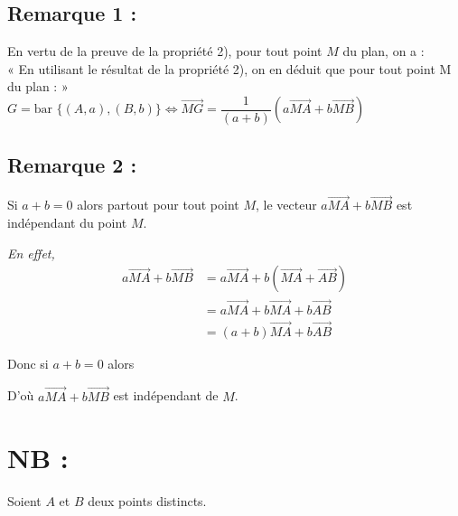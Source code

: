 \documentclass{article}
\begin{document}
\vspace{2em}

\subsection*{Remarque 1 :}

\noindent En vertu de la preuve de la propriété 2), pour tout point $M$ du plan, on a : \\
« En utilisant le résultat de la propriété 2), on en déduit que pour tout point M du plan : »\\
$G = \text{bar } \{(A, a), (B, b)\} \iff \overrightarrow{MG} = \dfrac{1}{(a + b)} \left( a \overrightarrow{MA} + b \overrightarrow{MB} \right)$

\subsection*{Remarque 2 :}

Si $a + b = 0$ alors partout pour tout point $M$, le vecteur $a\overrightarrow{MA} + b\overrightarrow{MB}$ est indépendant du point $M$.

\vspace{1em}

\noindent \textit{En effet,}
\begin{align*}
    a\overrightarrow{MA} + b\overrightarrow{MB} &= a\overrightarrow{MA} + b(\overrightarrow{MA} + \overrightarrow{AB}) \\
    &= a\overrightarrow{MA} + b\overrightarrow{MA} + b\overrightarrow{AB} \\
    &= (a + b)\overrightarrow{MA} + b\overrightarrow{AB}
\end{align*}

\noindent Donc si $a + b = 0$ alors 
\begin{center}
    \color{red}
\end{center}

\noindent D'où $a\overrightarrow{MA} + b\overrightarrow{MB}$ est indépendant de $M$.

\section*{NB :}

\noindent Soient $A$ et $B$ deux points distincts.

\vspace{1em}
\end{document}

